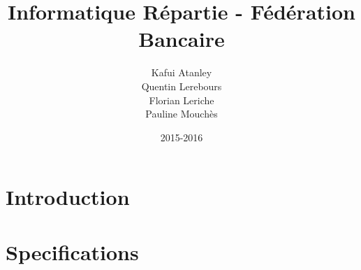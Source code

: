 \documentclass[a4paper,10pt]{report}
\title{Informatique Répartie - Fédération Bancaire}
\date{2015-2016}
\author{Kafui Atanley \\ Quentin Lerebours \\ Florian Leriche \\ Pauline Mouchès}
\begin{document}
\maketitle
\tableofcontents
\chapter{Introduction}

    


\chapter{Specifications}

   
\end{document}
